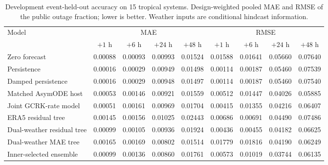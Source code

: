 \begin{table}[t]
\centering\small
\caption{Development event-held-out accuracy on 15 tropical systems. Design-weighted pooled MAE and RMSE of the public outage fraction; lower is better. Weather inputs are conditional hindcast information.}
\label{tab:tropical_forecasts}
\begin{tabular}{lcccccccc}
\toprule
\multirow{2}{*}{Model} & \multicolumn{4}{c}{MAE} & \multicolumn{4}{c}{RMSE} \\
\cmidrule(lr){2-5}\cmidrule(lr){6-9}
& $+1$ h & $+6$ h & $+24$ h & $+48$ h & $+1$ h & $+6$ h & $+24$ h & $+48$ h \\
\midrule
Zero forecast & 0.00088 & 0.00093 & 0.00993 & 0.01524 & 0.01588 & 0.01641 & 0.05660 & 0.07640 \\
Persistence & 0.00016 & 0.00029 & 0.00949 & 0.01498 & 0.00114 & 0.00187 & 0.05460 & 0.07539 \\
Damped persistence & 0.00016 & 0.00029 & 0.00948 & 0.01497 & 0.00114 & 0.00187 & 0.05460 & 0.07540 \\
Matched AsymODE host & 0.00053 & 0.00146 & 0.00921 & 0.01559 & 0.00512 & 0.01447 & 0.04026 & 0.05885 \\
Joint GCRK-rate model & 0.00051 & 0.00161 & 0.00969 & 0.01704 & 0.00415 & 0.01355 & 0.04216 & 0.06407 \\
ERA5 residual tree & 0.00145 & 0.00156 & 0.01025 & 0.02443 & 0.00686 & 0.00691 & 0.04490 & 0.07486 \\
Dual-weather residual tree & 0.00099 & 0.00105 & 0.00936 & 0.01924 & 0.00436 & 0.00455 & 0.04182 & 0.06625 \\
Dual-weather MAE tree & 0.00165 & 0.00169 & 0.00802 & 0.01514 & 0.01779 & 0.01816 & 0.04190 & 0.06249 \\
Inner-selected ensemble & 0.00099 & 0.00136 & 0.00860 & 0.01761 & 0.00573 & 0.01019 & 0.03744 & 0.06135 \\
\bottomrule
\end{tabular}
\end{table}
